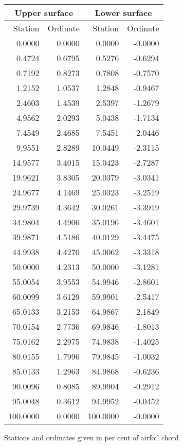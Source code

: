 \documentclass[11pt]{book}
\begin{document}
 \hspace{4mm}
 \begin{tabular}{|r|r|r|r|} \hline 
 \multicolumn{2}{|c|}{Upper surface} & \multicolumn{2}{|c|}{Lower surface} \\
 \hline
 Station & Ordinate & Station & Ordinate \\
 \hline
0.0000 & 0.0000 & 0.0000 & -0.0000 \\
0.4724 & 0.6795 & 0.5276 & -0.6294 \\
0.7192 & 0.8273 & 0.7808 & -0.7570 \\
1.2152 & 1.0537 & 1.2848 & -0.9467 \\
2.4603 & 1.4539 & 2.5397 & -1.2679 \\
4.9562 & 2.0293 & 5.0438 & -1.7134 \\
7.4549 & 2.4685 & 7.5451 & -2.0446 \\
9.9551 & 2.8289 & 10.0449 & -2.3115 \\
14.9577 & 3.4015 & 15.0423 & -2.7287 \\
19.9621 & 3.8305 & 20.0379 & -3.0341 \\
24.9677 & 4.1469 & 25.0323 & -3.2519 \\
29.9739 & 4.3642 & 30.0261 & -3.3919 \\
34.9804 & 4.4906 & 35.0196 & -3.4601 \\
39.9871 & 4.5186 & 40.0129 & -3.4475 \\
44.9938 & 4.4270 & 45.0062 & -3.3318 \\
50.0000 & 4.2313 & 50.0000 & -3.1281 \\
55.0054 & 3.9553 & 54.9946 & -2.8601 \\
60.0099 & 3.6129 & 59.9901 & -2.5417 \\
65.0133 & 3.2153 & 64.9867 & -2.1849 \\
70.0154 & 2.7736 & 69.9846 & -1.8013 \\
75.0162 & 2.2975 & 74.9838 & -1.4025 \\
80.0155 & 1.7996 & 79.9845 & -1.0032 \\
85.0133 & 1.2963 & 84.9868 & -0.6236 \\
90.0096 & 0.8085 & 89.9904 & -0.2912 \\
95.0048 & 0.3612 & 94.9952 & -0.0452 \\
100.0000 & 0.0000 & 100.0000 & -0.0000 \\
 \hline 
 \end{tabular}
 \vspace{8mm}

Stations and ordinates given in per cent of airfoil chord
\end{document}
